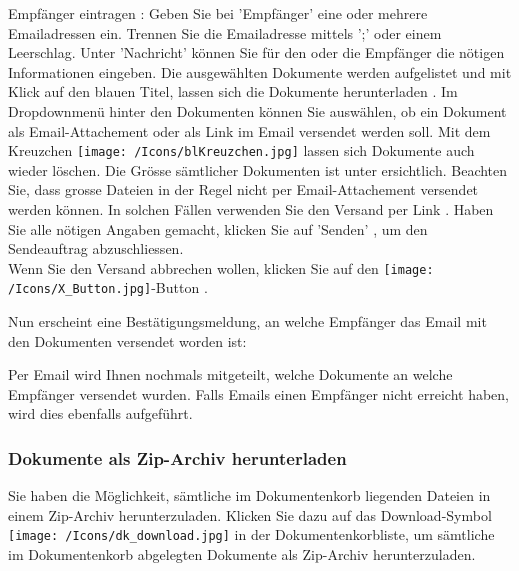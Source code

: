 Empfänger eintragen : Geben Sie bei 'Empfänger' eine oder mehrere Emailadressen ein. Trennen Sie die Emailadresse mittels ';' oder einem Leerschlag.
Unter 'Nachricht'  können Sie für den oder die Empfänger die nötigen Informationen eingeben. Die ausgewählten Dokumente werden aufgelistet und mit Klick auf den blauen Titel, lassen sich die Dokumente herunterladen . Im Dropdownmenü hinter den Dokumenten können Sie auswählen, ob ein Dokument als Email-Attachement  oder als Link im Email  versendet werden soll. Mit dem Kreuzchen \texttt{[image: /Icons/blKreuzchen.jpg]}  lassen sich Dokumente auch wieder löschen. Die Grösse sämtlicher Dokumenten ist unter  ersichtlich. Beachten Sie, dass grosse Dateien in der Regel nicht per Email-Attachement versendet werden können. In solchen Fällen verwenden Sie den Versand per Link . Haben Sie alle nötigen Angaben gemacht, klicken Sie auf 'Senden' , um den Sendeauftrag abzuschliessen.\\
Wenn Sie den Versand abbrechen wollen, klicken Sie auf den \texttt{[image: /Icons/X\_Button.jpg]}-Button .

\vspace{\baselineskip}

Nun erscheint eine Bestätigungsmeldung, an welche Empfänger das Email mit den Dokumenten versendet worden ist:

\begin{figure}[H]
\end{figure}

Per Email wird Ihnen nochmals mitgeteilt, welche Dokumente an welche Empfänger versendet wurden. Falls Emails einen Empfänger nicht erreicht haben, wird dies ebenfalls aufgeführt.

\subsubsection{Dokumente als Zip-Archiv herunterladen}

Sie haben die Möglichkeit, sämtliche im Dokumentenkorb liegenden Dateien in einem Zip-Archiv herunterzuladen. Klicken Sie dazu auf das Download-Symbol \texttt{[image: /Icons/dk\_download.jpg]} in der Dokumentenkorbliste, um sämtliche im Dokumentenkorb abgelegten Dokumente als Zip-Archiv herunterzuladen.

